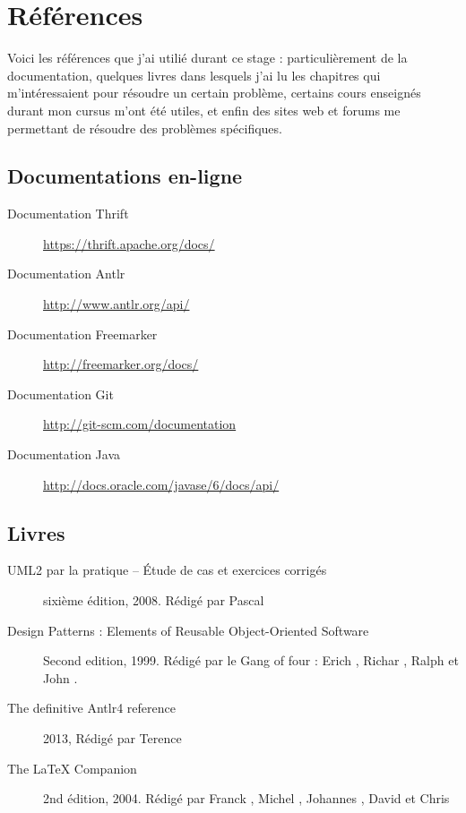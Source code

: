 \chapter{Références}
Voici les références que j'ai utilié durant ce stage : particulièrement de la documentation, quelques livres dans lesquels j'ai lu les chapitres qui m'intéressaient pour résoudre un certain problème, certains cours enseignés durant mon cursus m'ont été utiles, et enfin des sites web et forums me permettant de résoudre des problèmes spécifiques.

\section{Documentations en-ligne}
\begin{description}
	\item[Documentation Thrift] \url{https://thrift.apache.org/docs/}
	\item[Documentation Antlr] \url{http://www.antlr.org/api/}
	\item[Documentation Freemarker] \url{http://freemarker.org/docs/}
	\item[Documentation Git] \url{http://git-scm.com/documentation}	
	\item[Documentation Java] \url{http://docs.oracle.com/javase/6/docs/api/}
\end{description}

\section{Livres}
	\begin{description}
	\item[UML2 par la pratique -- \'Etude de cas et exercices corrigés] sixième édition, 2008. Rédigé par Pascal 
	\item[Design Patterns : Elements of Reusable Object-Oriented Software] Second edition, 1999. Rédigé par le Gang of four : Erich , Richar , Ralph  et John .	
		\item[The definitive Antlr4 reference] 2013, Rédigé par Terence 
	\item[The \LaTeX{} Companion] 2nd édition, 2004. Rédigé par Franck , Michel , Johannes , David  et Chris  
\end{description}
